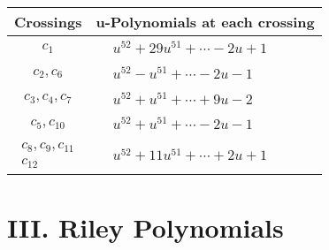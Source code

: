 \documentclass[1p]{elsarticle_modified}
\theoremstyle{definition}
\begin{document}
\begin{tabular}{m{50pt}|m{274pt}}
Crossings & \hspace{64pt}u-Polynomials at each crossing \\
\hline $$\begin{aligned}c_{1}\end{aligned}$$&$\begin{aligned}
&u^{52}+29 u^{51}+\cdots-2 u+1
\end{aligned}$\\
\hline $$\begin{aligned}c_{2},c_{6}\end{aligned}$$&$\begin{aligned}
&u^{52}- u^{51}+\cdots-2 u-1
\end{aligned}$\\
\hline $$\begin{aligned}c_{3},c_{4},c_{7}\end{aligned}$$&$\begin{aligned}
&u^{52}+u^{51}+\cdots+9 u-2
\end{aligned}$\\
\hline $$\begin{aligned}c_{5},c_{10}\end{aligned}$$&$\begin{aligned}
&u^{52}+u^{51}+\cdots-2 u-1
\end{aligned}$\\
\hline $$\begin{aligned}c_{8},c_{9},c_{11}\\c_{12}\end{aligned}$$&$\begin{aligned}
&u^{52}+11 u^{51}+\cdots+2 u+1
\end{aligned}$\\
\hline
\end{tabular}\newpage\renewcommand{\arraystretch}{1}
\centering \section*{ III. Riley Polynomials}
\end{document}
